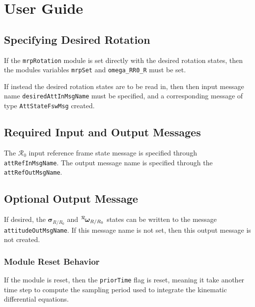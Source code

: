 
\section{User Guide}
\subsection{Specifying Desired Rotation}
If the {\tt mrpRotation} module is set directly with the desired rotation states, then the modules variables {\tt mrpSet} and {\tt omega\_RR0\_R} must be set.

If instead the desired rotation states are to be read in, then then input message name {\tt desiredAttInMsgName} must be specified, and a corresponding message of type {\tt AttStateFswMsg} created.  

\subsection{Required Input and Output Messages}
The $\mathcal{R}_{0}$ input reference frame state message is specified through {\tt attRefInMsgName}.
The output message name is specified through the {\tt attRefOutMsgName}. 

\subsection{Optional Output Message}
If desired, the $\bm\sigma_{R/R_{0}}$ and $\leftexp{R}{\bm\omega}_{R/R_{0}}$ states can be written to the message {\tt attitudeOutMsgName}.  If this message name is not set, then this output message is not created.  

\subsubsection{Module Reset Behavior}
If the module is reset, then the {\tt priorTime} flag is reset, meaning it take another time step to compute the sampling period used to integrate the kinematic differential equations.  
